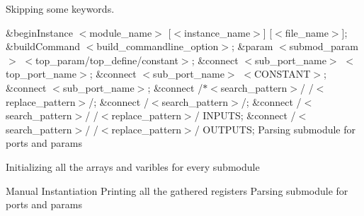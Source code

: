 Skipping some keywords.

\&begin\-Instance $<$module\-\_\-name$>$ \mbox{[}$<$instance\-\_\-name$>$\mbox{]} \mbox{[}$<$file\-\_\-name$>$\mbox{]}; \&build\-Command $<$build\-\_\-commandline\-\_\-option$>$; \&param $<$submod\-\_\-param$>$ $<$top\-\_\-param/top\-\_\-define/constant$>$; \&connect $<$sub\-\_\-port\-\_\-name$>$ $<$top\-\_\-port\-\_\-name$>$; \&connect $<$sub\-\_\-port\-\_\-name$>$ $<$\-C\-O\-N\-S\-T\-A\-N\-T$>$; \&connect $<$sub\-\_\-port\-\_\-name$>$; \&connect /$\ast$$<$search\-\_\-pattern$>$/ /$<$replace\-\_\-pattern$>$/; \&connect /$<$search\-\_\-pattern$>$/; \&connect /$<$search\-\_\-pattern$>$/ /$<$replace\-\_\-pattern$>$/ I\-N\-P\-U\-T\-S; \&connect /$<$search\-\_\-pattern$>$/ /$<$replace\-\_\-pattern$>$/ O\-U\-T\-P\-U\-T\-S;  Parsing submodule for ports and params

Initializing all the arrays and varibles for every submodule

Manual Instantiation Printing all the gathered registers Parsing submodule for ports and params

